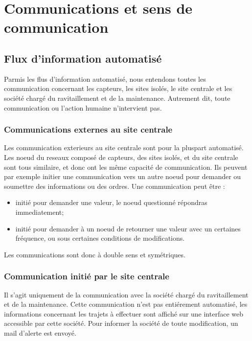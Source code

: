 \section{Communications et sens de communication}

    \subsection{Flux d'information automatisé}
        Parmis les flus d'information automatisé, nous entendons toutes les communication concernant les capteurs, les sites isolés, le site centrale et les société chargé du ravitaillement et de la maintenance. Autrement dit, toute communication ou l'action humaine n'intervient pas.
        \subsubsection{Communications externes au site centrale}
            Les communication exterieurs au site centrale sont pour la pluspart automatisé.
            Les noeud du reseaux composé de capteurs, des sites isolés, et du site centrale sont tous similaire, et donc ont les même capacité de communication. Ils peuvent par exemple initier une communication vers un autre noeud pour demander ou soumettre des informations ou des ordres.
            Une communication peut être :
            \begin{itemize}
                \item initié pour demander une valeur, le noeud questionné répondras immediatement;
                \item initié pour demander à un noeud de retourner une valeur avec un certaines fréquence, ou sous certaines conditions de modifications.
            \end{itemize}
            
            Les communications sont donc à double sens et symétriques.
            
        \subsubsection{Communication initié par le site centrale}

            Il s'agit uniquement de la communication avec la société chargé du ravitaillement et de la maintenance.
            Cette communication n'est pas entiérement automatisé, les informations concernant les trajets à effectuer sont affiché sur une interface web accessible par cette société. Pour informer la société de toute modification, un mail d'alerte est envoyé.
    
